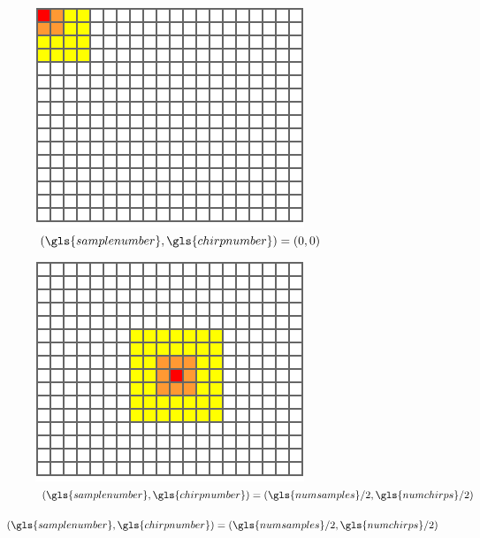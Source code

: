 \begin{figure}
    \centering
    \begin{subfigure}[b]{0.3\textwidth}
        \centering
        \includegraphics[width=\textwidth]{fig/4/ca-cfar-window-1.pdf}
        \caption{$(\gls{samplenumber}, \gls{chirpnumber}) = (0, 0)$}
    \end{subfigure}
    \hfill
    \begin{subfigure}[b]{0.3\textwidth}
        \centering
        \includegraphics[width=\textwidth]{fig/4/ca-cfar-window-2.pdf}
        \caption{$(\gls{samplenumber}, \gls{chirpnumber}) = (\gls{numsamples}/2, \gls{numchirps}/2)$}

\end{subfigure}
\end{figure}
